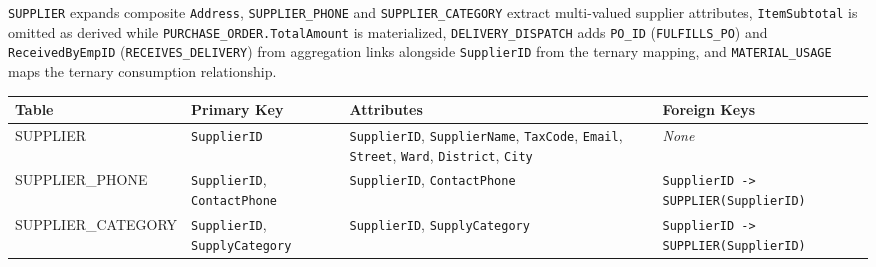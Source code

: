 \documentclass[a4paper,12pt]{report}
\newcounter{none} %
\begin{document}
\texttt{SUPPLIER} expands composite \texttt{Address}, \texttt{SUPPLIER\_\allowbreak{}PHONE} and \texttt{SUPPLIER\_\allowbreak{}CATEGORY} extract multi-valued supplier attributes, \texttt{ItemSubtotal} is omitted as derived while \texttt{PURCHASE\_\allowbreak{}ORDER.\allowbreak{}TotalAmount} is materialized, \texttt{DELIVERY\_\allowbreak{}DISPATCH} adds \texttt{PO\_\allowbreak{}ID} (\allowbreak{}\texttt{FULFILLS\_\allowbreak{}PO}) and \texttt{ReceivedByEmpID} (\allowbreak{}\texttt{RECEIVES\_\allowbreak{}DELIVERY}) from aggregation links alongside \texttt{SupplierID} from the ternary mapping, and \texttt{MATERIAL\_\allowbreak{}USAGE} maps the ternary consumption relationship.

{\def\LTcaptype{none} %
\begin{longtable}[]{@{}
  >{\raggedright\arraybackslash}p{}
  >{\raggedright\arraybackslash}p{}
  >{\raggedright\arraybackslash}p{}
  >{\raggedright\arraybackslash}p{}@{}}
\toprule\noalign{}
\begin{minipage}[b]{\linewidth}\raggedright
Table
\end{minipage} & \begin{minipage}[b]{\linewidth}\raggedright
Primary Key
\end{minipage} & \begin{minipage}[b]{\linewidth}\raggedright
Attributes
\end{minipage} & \begin{minipage}[b]{\linewidth}\raggedright
Foreign Keys
\end{minipage} \\
\midrule\noalign{}
\endhead
\bottomrule\noalign{}
\endlastfoot
SUPPLIER & \texttt{SupplierID} & \texttt{SupplierID}, \texttt{SupplierName}, \texttt{TaxCode}, \texttt{Email}, \texttt{Street}, \texttt{Ward}, \texttt{District}, \texttt{City} & \emph{None} \\
SUPPLIER\_\allowbreak{}PHONE & \texttt{SupplierID}, \texttt{ContactPhone} & \texttt{SupplierID}, \texttt{ContactPhone} & \texttt{SupplierID -\textgreater{} SUPPLIER(\allowbreak{}\allowbreak{}SupplierID)} \\
SUPPLIER\_\allowbreak{}CATEGORY & \texttt{SupplierID}, \texttt{SupplyCategory} & \texttt{SupplierID}, \texttt{SupplyCategory} & \texttt{SupplierID -\textgreater{} SUPPLIER(\allowbreak{}\allowbreak{}SupplierID)} \\

\end{longtable}}
\end{document}
